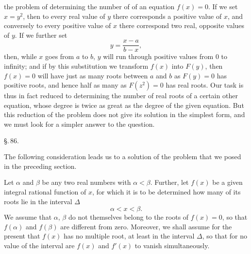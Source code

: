 the problem of determining the number of  of an equation $f(x) = 0$. If we set $x = y^2$, then to every real value of $y$ there corresponds a positive value of $x$, and conversely to every positive value of $x$ there correspond two real, opposite values of $y$. %
 If we further set
\[
y = \frac{x - a}{b - x},
\]
then, while $x$ goes from $a$ to $b$, $y$ will run through positive values from $0$ to infinity; and if by this substitution we transform $f(x)$ into $F(y)$, then $f(x) = 0$ will have just as many roots between $a$ and $b$ as $F(y) = 0$ has positive roots, and hence half as many as $F(z^2) = 0$ has real roots. Our task is thus in fact reduced to determining the number of real roots of a certain other equation, whose degree is twice as great as the degree of the given equation. But this reduction of the problem does not give its solution in the simplest form, and we must look for a simpler answer to the question.

\begin{center}
\S.\,86.

\end{center}

The following consideration leads us to a solution of the problem that we posed in the preceding section.

Let $\alpha$ and $\beta$ be any two real numbers with $\alpha < \beta$. Further, let $f(x)$ be a given integral rational function of $x$, for which it is to be determined how many of its roots lie in the interval $\Delta$
\[
\alpha < x < \beta\text{.}
\]
We assume that $\alpha$, $\beta$ do not themselves belong to the roots of $f(x) = 0$, so that $f(\alpha)$ and $f(\beta)$ are different from zero. Moreover, we shall assume for the present that $f(x)$ has no multiple root, at least in the interval $\Delta$, so that for no value of the interval are $f(x)$ and $f'(x)$ to vanish simultaneously.
